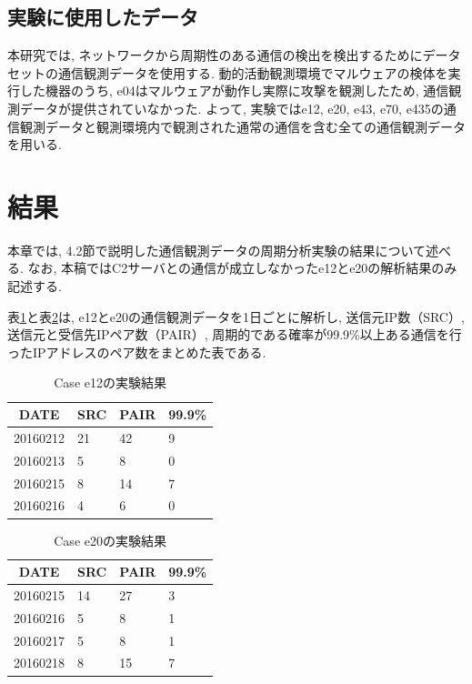 \documentclass[twocolumn,9pt]{ltjsarticle}
\begin{document}
\subsection{実験に使用したデータ}
本研究では, ネットワークから周期性のある通信の検出を検出するためにデータセットの通信観測データを使用する. 動的活動観測環境でマルウェアの検体を実行した機器のうち, e04はマルウェアが動作し実際に攻撃を観測したため, 通信観測データが提供されていなかった. よって, 実験ではe12, e20, e43, e70, e435の通信観測データと観測環境内で観測された通常の通信を含む全ての通信観測データを用いる. 

\section{結果}
本章では, 4.2節で説明した通信観測データの周期分析実験の結果について述べる. なお, 本稿ではC2サーバとの通信が成立しなかったe12とe20の解析結果のみ記述する. 

表\ref{tab:e12}と表\ref{tab:e20}は, e12とe20の通信観測データを1日ごとに解析し, 送信元IP数（SRC）, 送信元と受信先IPペア数（PAIR）, 周期的である確率が99.9\%以上ある通信を行ったIPアドレスのペア数をまとめた表である. 

\begin{table}[htbp]
    \centering
    \caption{Case e12の実験結果}

    \begin{tabular}{c||lll}
        \hline
        DATE & SRC & PAIR & 99.9\% \\
        \hline \hline
        20160212  & 21 & 42 & 9 \\
        20160213  & 5  & 8  & 0 \\
        20160215  & 8  & 14 & 7 \\
        20160216  & 4  & 6  & 0 \\
        \hline
    \end{tabular}

    \label{tab:e12}
\end{table}

\begin{table}[htbp]
    \centering
    \caption{Case e20の実験結果}

    \begin{tabular}{c||lll}
        \hline
        DATE & SRC & PAIR & 99.9\% \\
        \hline \hline
        20160215  & 14 & 27 & 3 \\
        20160216  & 5  & 8  & 1 \\
        20160217  & 5  & 8  & 1 \\
        20160218  & 8  & 15 & 7 \\
        \hline
    \end{tabular}

    \label{tab:e20}
\end{table}
\end{document}
